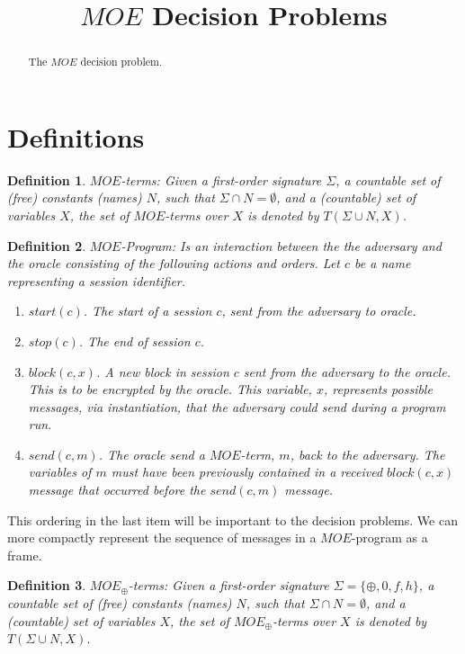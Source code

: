 \documentclass[11pt,twoside,a4paper]{article}
\title{ $MOE$ Decision Problems}
\newtheorem{definition}{Definition}
\begin{document}
\tableofcontents
\maketitle
\begin{abstract}
The $MOE$ decision problem. 

\end{abstract}


\pagebreak


\section{Definitions}

\begin{definition}
	$MOE$-terms: Given a first-order signature $\Sigma$, a countable set of (free) constants (names) $N$, such that $\Sigma \cap N =\emptyset$, and a (countable) set of variables $X$, the set of $MOE$-terms over $X$ is denoted by $T(\Sigma \cup N,X)$. 
\end{definition}



\begin{definition}
	$MOE$-Program: Is an interaction between the 
	the adversary and the oracle consisting of the following actions
	and orders. Let $c$ be a name representing a session identifier.
	\begin{enumerate}
		\item $start(c)$. The start of a session $c$, sent from the
		adversary to oracle.
		\item $stop(c)$. The end of session $c$.
		\item $block(c, x)$. A new block in session $c$ sent from
		the adversary to the oracle. This is to be encrypted by the 
		oracle. This variable, $x$, represents possible messages, via
		instantiation, that the adversary could send during a program
		run. 
		\item $send(c, m)$. The oracle send a $MOE$-term, $m$, back
		to the adversary. The variables of $m$ must have been 
		previously contained in a received $block(c, x)$ message
		that occurred before the $send(c, m)$ message.
	\end{enumerate} 
\end{definition}
This ordering in the last item will be important to the decision 
problems. We can more compactly represent the sequence of messages
in a $MOE$-program as a frame. 

\begin{definition}
	$MOE_{\oplus}$-terms: Given a first-order signature $\Sigma=\{
	\oplus, 0, f, h\}$, a countable set of (free) constants (names) $N$, such that $\Sigma \cap N =\emptyset$, and a (countable) set of variables $X$, the set of $MOE_{\oplus}$-terms over $X$ is denoted by $T(\Sigma \cup N,X)$. 
\end{definition}
\end{document}
